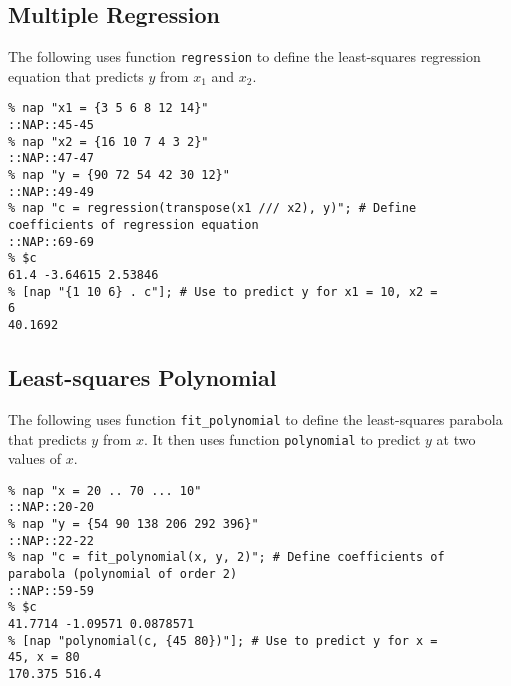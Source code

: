   \subsection{Multiple Regression}
The following uses function 
  \texttt{regression} to define the least-squares regression
  equation that predicts 
  $y$ from $x_1$ and $x_2$.
  \begin{verbatim}
% nap "x1 = {3 5 6 8 12 14}"
::NAP::45-45
% nap "x2 = {16 10 7 4 3 2}"
::NAP::47-47
% nap "y = {90 72 54 42 30 12}"
::NAP::49-49
% nap "c = regression(transpose(x1 /// x2), y)"; # Define
coefficients of regression equation
::NAP::69-69
% $c
61.4 -3.64615 2.53846
% [nap "{1 10 6} . c"]; # Use to predict y for x1 = 10, x2 =
6
40.1692
\end{verbatim}

  \subsection{Least-squares Polynomial}
The following uses function 
  \texttt{fit\_polynomial} to define the least-squares parabola that
  predicts 
  $y$ from 
  $x$. It then uses function 
  \texttt{polynomial} to predict 
  $y$ at two values of 
  $x$.
  \begin{verbatim}
% nap "x = 20 .. 70 ... 10"
::NAP::20-20
% nap "y = {54 90 138 206 292 396}"
::NAP::22-22
% nap "c = fit_polynomial(x, y, 2)"; # Define coefficients of
parabola (polynomial of order 2)
::NAP::59-59
% $c
41.7714 -1.09571 0.0878571
% [nap "polynomial(c, {45 80})"]; # Use to predict y for x =
45, x = 80
170.375 516.4
\end{verbatim}


